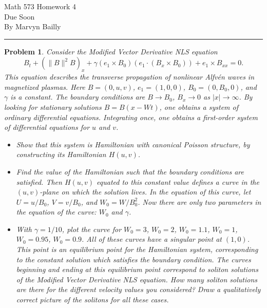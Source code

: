\documentclass[12pt]{report}
\newtheorem{problem}{Problem}
\begin{document}
\large

\begin{center}
 Math 573 Homework 4\\
 Due Soon\\
 By Marvyn Bailly\\
\end{center}

\normalsize

\hrule



\begin{problem}
    Consider the Modified Vector Derivative NLS equation
$$
B_t+(\|B\|^2B)_x+\gamma (e_1\times
B_0)\left(e_1\cdot (B_x\times
B_0)\right)+e_1\times B_{xx}=0.
$$
This equation describes the transverse
propagation of nonlinear Alfv\'en waves in
magnetized plasmas. Here $B=(0,u,v)$, $e_1=(1,0,0)$,
$B_0=(0,B_0,0)$, and $\gamma$ is a constant. The boundary conditions are
$B\rightarrow B_0$, $B_x \rightarrow 0$ as $|x|\rightarrow
\infty$.
By looking for stationary solutions $B=B(x-W t)$, one obtains a
system of ordinary differential equations. Integrating once, one obtains a
first-order system of differential equations for $u$ and $v$.
\begin{itemize}
\item[a)] Show that this system is
Hamiltonian with canonical Poisson structure, by constructing its Hamiltonian
$H(u,v)$.
\item[b)]
Find the value of the Hamiltonian such that the boundary conditions are
satisfied. Then $H(u,v)$ equated to this constant value defines a curve in the
$(u,v)$-plane on which the solution lives. In the equation of this curve, let
$U=u/B_0$, $V=v/B_0$, and $W_0=W/B_0^2$. Now there are only two parameters in the
equation of the curve: $W_0$ and $\gamma$.
\item[c)] With $\gamma=1/10$, plot the curve for $W_0=3$, $W_0=2$, $W_0=1.1$,
$W_0=1$, $W_0=0.95$, $W_0=0.9$. All of these curves have a singular point at
$(1,0)$. This point is an equilibrium point for the Hamiltonian system,
corresponding to the constant solution which satisfies the boundary condition.
The curves beginning and ending at this equilibrium point correspond to
soliton solutions of the Modified Vector Derivative  NLS equation. How many soliton
solutions are there for the different velocity values you considered? Draw a
qualitatively correct picture of the solitons for all these cases.
\end{itemize}
\end{problem}
\end{document}
